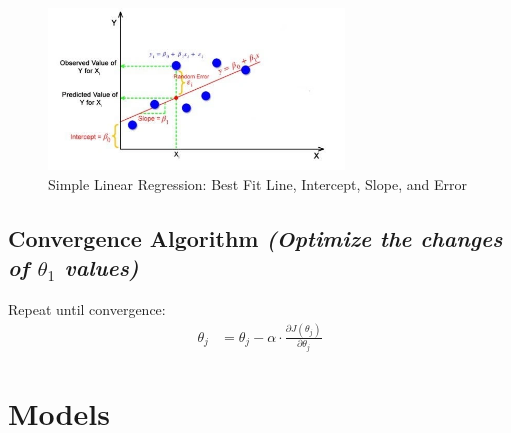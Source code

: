 \documentclass{article}
\begin{document}
\begin{figure}[h!]
    \centering
    \includegraphics[width=0.7\textwidth]{best_fit.png} %
    \caption{Simple Linear Regression: Best Fit Line, Intercept, Slope, and Error}
    \label{fig:linear_regression}
\end{figure}
\vspace{1cm} %

\subsection{Convergence Algorithm \textit{(Optimize the changes of $\theta_1$ values)}}
Repeat until convergence:
\begin{align*}  
    \theta_j &= \theta_j - \alpha \cdot \frac{\partial J(\theta_j)}{\partial \theta_j} 
\end{align*}














































\vspace{1cm} %


\section{Models}
\end{document}
